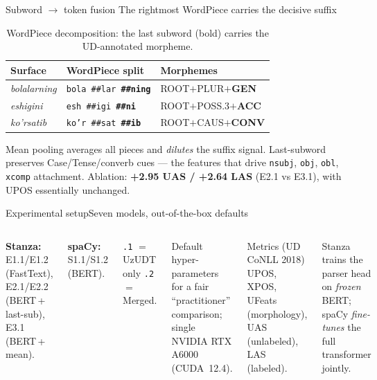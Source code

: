 \documentclass[t,10pt]{beamer}
\newcommand{\best}[1]{\textcolor{edmgreen}{\textbf{#1}}}
\begin{document}
\begin{frame}{Subword $\to$ token fusion}%
             {The rightmost WordPiece carries the decisive suffix}
  \begin{table}
    {\small\setlength{\tabcolsep}{4pt}
    \begin{tabular}{lll}
      \textbf{Surface} & \textbf{WordPiece split} & \textbf{Morphemes}\\
      \toprule
      \textit{bolalarning} & \texttt{bola \#\#lar }\best{\texttt{\#\#ning}}
        & ROOT$+$PLUR$+$\best{GEN}\\
      \textit{eshigini} & \texttt{esh \#\#igi }\best{\texttt{\#\#ni}}
        & ROOT$+$POSS.3$+$\best{ACC}\\
      \textit{ko'rsatib} & \texttt{ko'r \#\#sat }\best{\texttt{\#\#ib}}
        & ROOT$+$CAUS$+$\best{CONV}\\
      \bottomrule
    \end{tabular}}
    \caption{WordPiece decomposition: the last subword (bold) carries the UD-annotated morpheme.}
  \end{table}
  \footnotesize
  \alert{Mean pooling} averages all pieces and \emph{dilutes} the suffix
  signal. \alert{Last-subword} preserves Case/Tense/converb cues --- the
  features that drive \texttt{nsubj}, \texttt{obj}, \texttt{obl},
  \texttt{xcomp} attachment.
  Ablation: \best{+2.95 UAS / +2.64 LAS} (E2.1 vs E3.1),
  with UPOS essentially unchanged.
\end{frame}

\begin{frame}{Experimental setup}{Seven models, out-of-the-box defaults}
  \begin{columns}[onlytextwidth]
      \footnotesize
      \textbf{Stanza:} E1.1/E1.2 (FastText), E2.1/E2.2
      (BERT\,+\,last-sub), E3.1 (BERT\,+\,mean).\par\smallskip
      \textbf{spaCy:} S1.1/S1.2 (BERT).\par\medskip
      \texttt{.1} $=$ UzUDT only \quad \texttt{.2} $=$ Merged.\par\medskip
      Default hyper-parameters for a fair ``practitioner'' comparison;
      single NVIDIA RTX A6000 (CUDA~12.4).
      \begin{block}{Metrics (UD CoNLL 2018)}
        \footnotesize
        UPOS, XPOS, UFeats (morphology),\\
        UAS (unlabeled), LAS (labeled).
      \end{block}
      \smallskip\footnotesize
      Stanza trains the parser head on \emph{frozen} BERT;
      spaCy \emph{fine-tunes} the full transformer jointly.
  \end{columns}
\end{frame}
\end{document}
